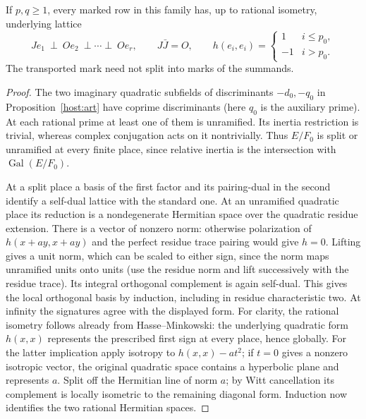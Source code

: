 \begin{lemma}\label{cmeig:row}
If \(p,q\ge1\), every marked row in this family has, up to rational
isometry, underlying lattice
\[
        J e_1\ \perp\ O e_2\ \perp\cdots\perp\ O e_r,\qquad
        J\bar J=O,\qquad
        h(e_i,e_i)=
        \begin{cases}1&i\le p_0,\\-1&i>p_0.\end{cases}
\]
The transported mark need not split into marks of the summands.
\end{lemma}
\begin{proof}
The two imaginary quadratic subfields of discriminants
\(-d_0,-q_0\) in Proposition~\ref{host:art} have coprime
discriminants (here \(q_0\) is the auxiliary prime). At each
rational prime at least one of them is unramified. Its inertia
restriction is trivial, whereas complex conjugation acts on it
nontrivially. Thus \(E/F_0\) is split or unramified at every finite
place, since relative inertia is the intersection with
\(\operatorname{Gal}(E/F_0)\).

At a split place a basis of the first factor and its pairing-dual
in the second identify a self-dual lattice with the standard one.
At an unramified quadratic place its reduction is a nondegenerate
Hermitian space over the quadratic residue extension. There is a
vector of nonzero norm: otherwise polarization of \(h(x+ay,x+ay)\)
and the perfect residue trace pairing would give \(h=0\).
Lifting gives a unit norm, which can be scaled to either sign,
since the norm maps unramified units onto units (use the residue
norm and lift successively with the residue trace). Its integral
orthogonal complement is again self-dual. This gives the local
orthogonal basis by induction, including in residue characteristic
two. At infinity the signatures agree with the displayed form.
For clarity, the rational isometry follows already from
Hasse--Minkowski: the underlying quadratic form \(h(x,x)\)
represents the prescribed first sign at every place, hence globally.
For the latter implication apply isotropy to \(h(x,x)-a t^2\);
if \(t=0\) gives a nonzero isotropic vector, the original quadratic
space contains a hyperbolic plane and represents \(a\).
Split off the Hermitian line of norm \(a\); by Witt cancellation its
complement is locally isometric to the remaining diagonal form.
Induction now identifies the two rational Hermitian spaces.


\end{proof}
